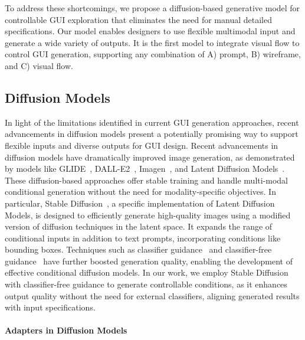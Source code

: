 To address these shortcomings, we propose a diffusion-based generative model for controllable GUI exploration that eliminates the need for manual detailed specifications. Our model enables designers to use flexible multimodal input and generate a wide variety of outputs. It is the first model to integrate visual flow to control GUI generation, supporting any combination of A) prompt, B) wireframe, and C) visual flow.




\subsection{Diffusion Models}

In light of the limitations identified in current GUI generation approaches, recent advancements in diffusion models present a potentially promising way to support flexible inputs and diverse outputs for GUI design.
Recent advancements in diffusion models have dramatically improved image generation, as demonstrated by models like GLIDE~\cite{nichol2021glide}, DALL-E2~\cite{ramesh2022hierarchical}, Imagen~\cite{saharia2022photorealistic}, and Latent Diffusion Models~\cite{rombach2022high}. These diffusion-based approaches offer stable training and handle multi-modal conditional generation without the need for modality-specific objectives.
In particular, Stable Diffusion~\cite{rombach2022high}, a specific implementation of Latent Diffusion Models,  is designed to efficiently generate high-quality images using a modified version of diffusion techniques in the latent space. It expands the range of conditional inputs in addition to text prompts, incorporating conditions like bounding boxes.
Techniques such as classifier guidance~\cite{dhariwal2021diffusion} and classifier-free guidance~\cite{ho2022classifier} have further boosted generation quality, enabling the development of effective conditional diffusion models. 
In our work, we employ Stable Diffusion with classifier-free guidance to generate controllable conditions, as it enhances output quality without the need for external classifiers, aligning generated results with input specifications.

\paragraph{Adapters in Diffusion Models}  

